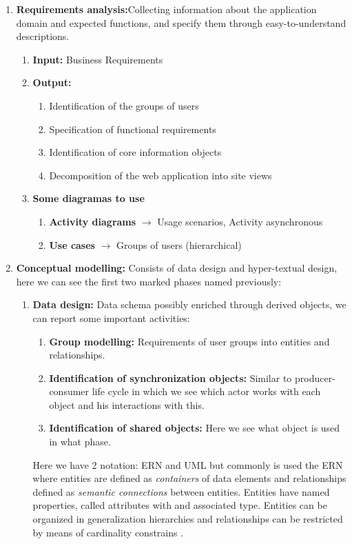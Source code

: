 \documentclass[a4paper]{memoir}
\begin{document}
	\begin{enumerate}
		\item \textbf{Requirements analysis:}Collecting information about the application domain and expected functions, and specify them through easy-to-understand descriptions.
		\begin{enumerate}
			\item \textbf{Input:} Business Requirements
			\item \textbf{Output:}
				\begin{enumerate}
					\item Identification of the groups of users
					\item Specification of functional requirements
					\item Identification of core information objects
					\item Decomposition of the web application into site views
				\end{enumerate}
			\item \textbf{Some diagramas to use \cite {Fowler2003}}
				\begin{enumerate}
					\item \textbf{Activity diagrams} $\rightarrow$ Usage scenarios, Activity asynchronous
					\item \textbf{Use cases} $\rightarrow$ Groups of users (hierarchical)
				\end{enumerate}
		\end{enumerate}
		\item \textbf{Conceptual modelling:} Consists of data design and hyper-textual design, here we can see the first two marked phases named previously:
		\begin{enumerate}
			\item \textbf{Data design:} Data schema possibly enriched through derived objects, we can report some important activities:
			\begin{enumerate}
				\item \textbf{Group modelling:} Requirements of user groups into entities and relationships.
				\item \textbf{Identification of synchronization objects:} Similar to producer-consumer life cycle in which we see which actor works with each object and his interactions with this.
				\item \textbf{Identification of shared objects:} Here we see what object is used in what phase.
			\end{enumerate}	
			Here we have 2 notation: \ac{ERN} and \ac{UML} but commonly is used the \ac{ERN} where entities are defined as \textit{containers} of data elements and relationships defined as \textit{semantic connections} between entities. Entities have named properties, called attributes with and associated type. Entities can be organized in generalization hierarchies and relationships can be restricted by means of cardinality constrains \cite{Matera2003}.

\end{enumerate}
\end{enumerate}
\end{document}
